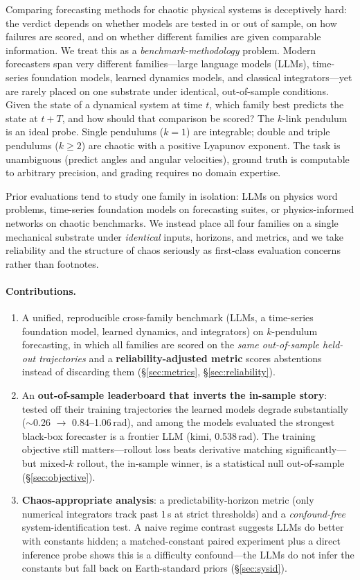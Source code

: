 \documentclass{article}
\begin{document}
Comparing forecasting methods for chaotic physical systems is deceptively hard: the
verdict depends on whether models are tested in or out of sample, on how failures are
scored, and on whether different families are given comparable information. We treat this
as a \emph{benchmark-methodology} problem. Modern forecasters span very different
families---large language models (LLMs), time-series foundation models, learned dynamics
models, and classical integrators---yet are rarely placed on one substrate under
identical, out-of-sample conditions. Given the state of a dynamical system at time $t$,
which family best predicts the state at $t+T$, and how should that comparison be scored?
The $k$-link pendulum is an ideal probe. Single
pendulums ($k{=}1$) are integrable; double and triple pendulums ($k{\ge}2$) are
chaotic with a positive Lyapunov exponent. The task is unambiguous (predict
angles and angular velocities), ground truth is computable to arbitrary
precision, and grading requires no domain expertise.

Prior evaluations tend to study one family in isolation: LLMs on physics word
problems, time-series foundation models on forecasting suites, or
physics-informed networks on chaotic benchmarks. We instead place all four
families on a single mechanical substrate under \emph{identical} inputs, horizons,
and metrics, and we take reliability and the structure of chaos seriously as
first-class evaluation concerns rather than footnotes.

\paragraph{Contributions.}
\begin{enumerate}[leftmargin=1.4em,itemsep=2pt,topsep=2pt]
\item A unified, reproducible cross-family benchmark (LLMs, a time-series
foundation model, learned dynamics, and integrators) on $k$-pendulum forecasting,
in which all families are scored on the \emph{same out-of-sample held-out
trajectories} and a \textbf{reliability-adjusted metric} scores abstentions instead
of discarding them (\S\ref{sec:metrics}, \S\ref{sec:reliability}).
\item An \textbf{out-of-sample leaderboard that inverts the in-sample story}: tested
off their training trajectories the learned models degrade substantially ($\sim$0.26 $\to$
0.84--1.06\,rad), and among the models evaluated the strongest black-box forecaster is a
frontier LLM (kimi,
0.538\,rad). The training objective still matters---rollout loss beats derivative
matching significantly---but mixed-$k$ rollout, the in-sample winner, is a
statistical null out-of-sample (\S\ref{sec:objective}).
\item \textbf{Chaos-appropriate analysis}: a predictability-horizon metric (only
numerical integrators track past $1$\,s at strict thresholds) and a
\emph{confound-free} system-identification test. A naive regime contrast suggests
LLMs do better with constants hidden; a matched-constant paired experiment plus a
direct inference probe shows this is a difficulty confound---the LLMs do not infer
the constants but fall back on Earth-standard priors (\S\ref{sec:sysid}).
\end{enumerate}
\end{document}
